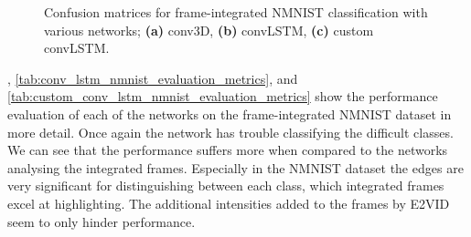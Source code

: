 \begin{figure}[htb]%
    \centering
    \qquad
    \qquad
    \caption{Confusion matrices for frame-integrated NMNIST classification with various networks; \textbf{(a)} conv3D, \textbf{(b)} convLSTM, \textbf{(c)} custom convLSTM.}%
    \label{fig:nmnist_c_matrices}%
\end{figure}

, \cref{tab:conv_lstm_nmnist_evaluation_metrics}, and \cref{tab:custom_conv_lstm_nmnist_evaluation_metrics} show the performance evaluation of each of the networks on the frame-integrated NMNIST dataset in more detail. Once again the network has trouble classifying the difficult classes. We can see that the performance suffers more when compared to the networks analysing the integrated frames. Especially in the NMNIST dataset the edges are very significant for distinguishing between each class, which integrated frames excel at highlighting. The additional intensities added to the frames by E2VID seem to only hinder performance.

